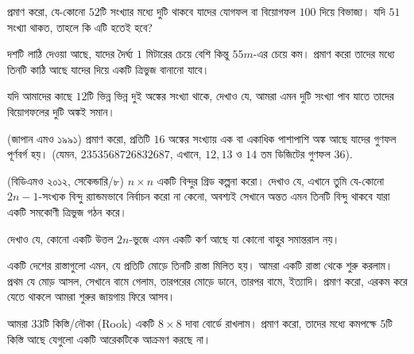 \begin{exercise}
প্রমাণ করো, যে-কোনো $52$টি সংখ্যার মধ্যে দুটি থাকবে যাদের যোগফল বা বিয়োগফল $100$ দিয়ে বিভাজ্য। যদি $51$ সংখ্যা থাকত, তাহলে কি এটি হতেই হবে?
\end{exercise}

\begin{exercise}
দশটি লাঠি দেওয়া আছে, যাদের দৈর্ঘ্য $1$ মিটারের চেয়ে বেশি কিন্তু $55m$-এর চেয়ে কম। প্রমাণ করো তাদের মধ্যে তিনটি কাঠি আছে যাদের দিয়ে একটি ত্রিভুজ বানানো যাবে।
\end{exercise}

\begin{exercise}
যদি আমাদের কাছে $12$টি ভিন্ন ভিন্ন দুই অঙ্কের সংখ্যা থাকে, দেখাও যে, আমরা এমন দুটি সংখ্যা পাব যাতে তাদের বিয়োগফলের দুটি অঙ্কই সমান।
\end{exercise}

\begin{exercise}
(জাপান এমও ১৯৯১) প্রমাণ করো, প্রতিটি $16$ অঙ্কের সংখ্যায় এক বা একাধিক পাশাপাশি অঙ্ক আছে যাদের গুণফল পূর্ণবর্গ হয়। (যেমন, $2353568726832687$, এখানে, $12, 13$ ও $14$ তম ডিজিটের গুণফল $36$).
\end{exercise}

\begin{exercise}
(বিডিএমও ২০১২, সেকেন্ডারি/৮) $n \times n$ একটি বিন্দুর গ্রিড কল্পনা করো। দেখাও যে, এখানে তুমি যে-কোনো $2n - 1$-সংখ্যক বিন্দু র‍্যান্ডমভাবে নির্বাচন করো না কেনো, অবশ্যই সেখানে অন্তত এমন তিনটি বিন্দু থাকবে যারা একটি সমকোণী ত্রিভুজ গঠন করে।
\end{exercise}

\begin{exercise}
দেখাও যে, কোনো একটি উত্তল $2n$-ভুজে এমন একটি কর্ণ আছে যা কোনো বাহুর সমান্তরাল নয়।
\end{exercise}

\begin{exercise}
একটি দেশের রাস্তাগুলো এমন, যে প্রতিটি মোড়ে তিনটি রাস্তা মিলিত হয়। আমরা একটি রাস্তা থেকে শুরু করলাম। প্রথম যে মোড় আসল, সেখানে বামে গেলাম, তারপরের মোড়ে ডানে, তারপর বামে, ইত্যাদি। প্রমাণ করো, এরকম করে যেতে থাকলে আমরা শুরুর জায়গায় ফিরে আসব।
\end{exercise}

\begin{exercise}
আমরা $33$টি কিস্তি/নৌকা (Rook) একটি $8 \times 8$ দাবা বোর্ডে রাখলাম। প্রমাণ করো, তাদের মধ্যে কমপক্ষে $5$টি কিস্তি আছে যেগুলো একটি আরেকটিকে আক্রমণ করছে না।
\end{exercise}

